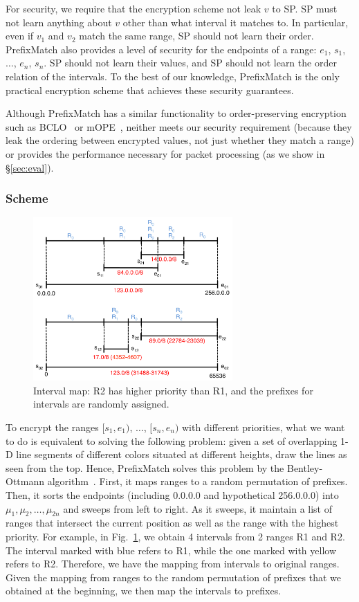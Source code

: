 For security, we require that the encryption scheme  not leak $v$ to SP.
SP must not learn anything about $v$ other than what interval it matches to. 
In  particular, even if $v_1$ and $v_2$ match the same range, SP should not learn their order.
PrefixMatch also provides a level of security for the endpoints of a range:
 $e_1$, $s_1$, $\dots$, $e_n$, $s_n$. SP should not learn their values, and SP should not learn the order relation of the intervals. 
To the best of our knowledge, PrefixMatch is the only practical encryption scheme that achieves these security guarantees.

Although PrefixMatch has a similar functionality to order-preserving encryption such as BCLO~\cite{boldyreva:ope} or mOPE~\cite{popa:mope}, neither meets our security requirement (because they leak the ordering between encrypted values, not just whether they match a range) or provides the performance necessary for packet processing (as we show in \S\ref{sec:eval}).

\subsubsection{Scheme} 
\label{sec:rmscheme}

\begin{figure}[t]
  \centering
  \includegraphics[width=3in]{fig/rangeopts3.pdf}
  \caption[]{Interval map: R2 has higher priority than R1, and the prefixes for intervals are randomly assigned.\label{fig:rangeopts3}}
\end{figure}

To encrypt the ranges $[s_1, e_1)$, $\dots$, $[s_n, e_n)$ with different priorities, what we want to do is equivalent to solving the following problem: given a set of overlapping 1-D line segments of different colors situated at different heights, draw the lines as seen from the top. Hence, PrefixMatch solves this problem by the Bentley-Ottmann algorithm~\cite{bentley}. First, it maps ranges to a random permutation of prefixes. Then, it sorts the endpoints (including 0.0.0.0 and hypothetical 256.0.0.0) into $\mu_1, \mu_2, \dots, \mu_{2n}$ and 
sweeps from left to right. As it sweeps, it maintain a list of ranges that intersect the current position as well as the range with the highest priority. For example, in Fig.~\ref{fig:rangeopts3}, we obtain 4 intervals from 2 ranges R1 and R2. The interval marked with blue refers to R1, while the one marked with yellow refers to R2. Therefore, we have the mapping from intervals to original ranges. Given the mapping from ranges to the random permutation of prefixes that we obtained at the beginning, we then map the intervals to prefixes.

